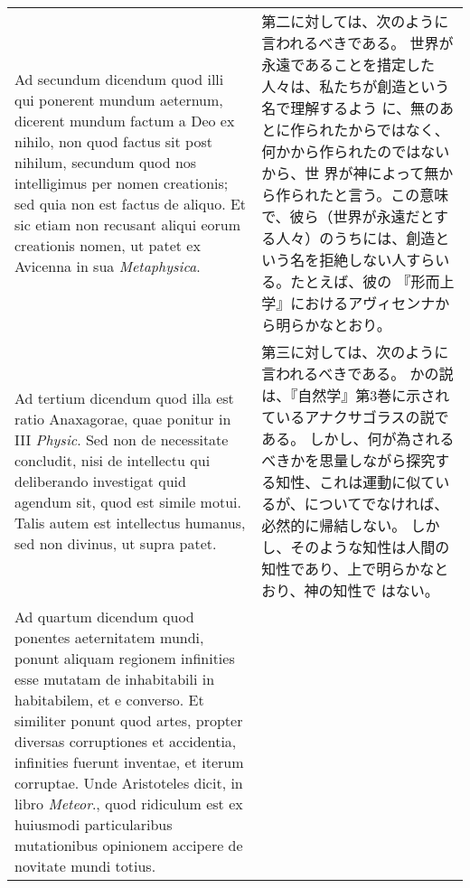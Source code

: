 \documentclass[10pt]{jsarticle} %
\begin{document}
\begin{longtable}{p{21em}p{21em}}
\\


{\sc Ad secundum dicendum} quod illi qui ponerent mundum aeternum, dicerent
 mundum factum a Deo ex nihilo, non quod factus sit post nihilum,
 secundum quod nos intelligimus per nomen creationis; sed quia non est
 factus de aliquo. Et sic etiam non recusant
aliqui eorum creationis
 nomen, ut patet ex Avicenna in sua {\it Metaphysica}.

&
第二に対しては、次のように言われるべきである。
世界が永遠であることを措定した人々は、私たちが創造という名で理解するよう
 に、無のあとに作られたからではなく、何かから作られたのではないから、世
 界が神によって無から作られたと言う。この意味で、彼ら（世界が永遠だとす
 る人々）のうちには、創造という名を拒絶しない人すらいる。たとえば、彼の
 『形而上学』におけるアヴィセンナから明らかなとおり。



\\


{\sc Ad tertium dicendum} quod illa est ratio Anaxagorae, quae ponitur
 in III {\it Physic}. Sed non de necessitate concludit, nisi de intellectu qui
 deliberando investigat quid agendum sit, quod est simile motui. Talis
 autem est intellectus humanus, sed non divinus, ut supra patet.


&

第三に対しては、次のように言われるべきである。
かの説は、『自然学』第3巻に示されているアナクサゴラスの説である。
しかし、何が為されるべきかを思量しながら探究する知性、これは運動に似てい
 るが、についてでなければ、必然的に帰結しない。
しかし、そのような知性は人間の知性であり、上で明らかなとおり、神の知性で
 はない。


\\


{\sc Ad quartum dicendum} quod ponentes aeternitatem mundi, ponunt
 aliquam regionem infinities esse mutatam de inhabitabili in
 habitabilem, et e converso. Et similiter ponunt quod artes, propter
 diversas corruptiones et accidentia, infinities fuerunt inventae, et
 iterum corruptae. Unde Aristoteles dicit, in libro {\it Meteor}., quod
 ridiculum est ex huiusmodi particularibus mutationibus opinionem
 accipere de novitate mundi totius.


\end{longtable}
\end{document}
